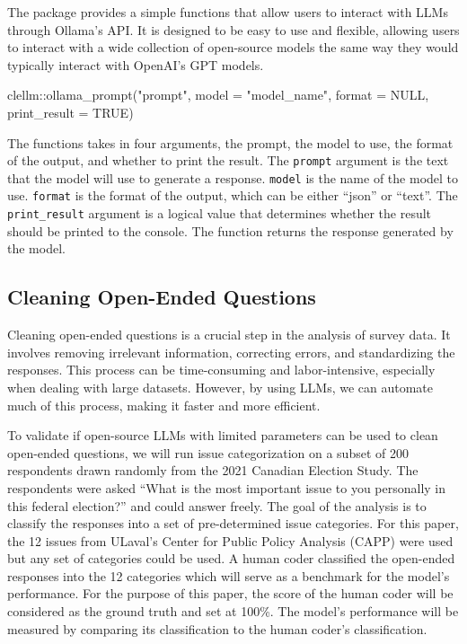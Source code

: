 \documentclass[
  authoryear,
  preprint,
  3p]{elsarticle}
\newenvironment{Shaded}{\begin{snugshade}}{\end{snugshade}}
\newcommand{\AttributeTok}[1]{\textcolor[rgb]{0.40,0.45,0.13}{#1}}
\newcommand{\ConstantTok}[1]{\textcolor[rgb]{0.56,0.35,0.01}{#1}}
\newcommand{\FunctionTok}[1]{\textcolor[rgb]{0.28,0.35,0.67}{#1}}
\newcommand{\NormalTok}[1]{\textcolor[rgb]{0.00,0.23,0.31}{#1}}
\newcommand{\SpecialCharTok}[1]{\textcolor[rgb]{0.37,0.37,0.37}{#1}}
\newcommand{\StringTok}[1]{\textcolor[rgb]{0.13,0.47,0.30}{#1}}
\begin{document}
The package provides a simple functions that allow users to interact
with LLMs through Ollama's API. It is designed to be easy to use and
flexible, allowing users to interact with a wide collection of
open-source models the same way they would typically interact with
OpenAI's GPT models.

\begin{Shaded}
\begin{Highlighting}[]
\NormalTok{clellm}\SpecialCharTok{::}\FunctionTok{ollama\_prompt}\NormalTok{(}\StringTok{"prompt"}\NormalTok{, }\AttributeTok{model =} \StringTok{"model\_name"}\NormalTok{, }\AttributeTok{format =} \ConstantTok{NULL}\NormalTok{, }\AttributeTok{print\_result =} \ConstantTok{TRUE}\NormalTok{) }
\end{Highlighting}
\end{Shaded}

The functions takes in four arguments, the prompt, the model to use, the
format of the output, and whether to print the result. The
\texttt{prompt} argument is the text that the model will use to generate
a response. \texttt{model} is the name of the model to use.
\texttt{format} is the format of the output, which can be either
``json'' or ``text''. The \texttt{print\_result} argument is a logical
value that determines whether the result should be printed to the
console. The function returns the response generated by the model.

\subsection{Cleaning Open-Ended
Questions}\label{cleaning-open-ended-questions}

Cleaning open-ended questions is a crucial step in the analysis of
survey data. It involves removing irrelevant information, correcting
errors, and standardizing the responses. This process can be
time-consuming and labor-intensive, especially when dealing with large
datasets. However, by using LLMs, we can automate much of this process,
making it faster and more efficient.

To validate if open-source LLMs with limited parameters can be used to
clean open-ended questions, we will run issue categorization on a subset
of 200 respondents drawn randomly from the 2021 Canadian Election Study.
The respondents were asked ``What is the most important issue to you
personally in this federal election?'' and could answer freely. The goal
of the analysis is to classify the responses into a set of
pre-determined issue categories. For this paper, the 12 issues from
ULaval's Center for Public Policy Analysis (CAPP) were used but any set
of categories could be used. A human coder classified the open-ended
responses into the 12 categories which will serve as a benchmark for the
model's performance. For the purpose of this paper, the score of the
human coder will be considered as the ground truth and set at 100\%. The
model's performance will be measured by comparing its classification to
the human coder's classification.
\end{document}
